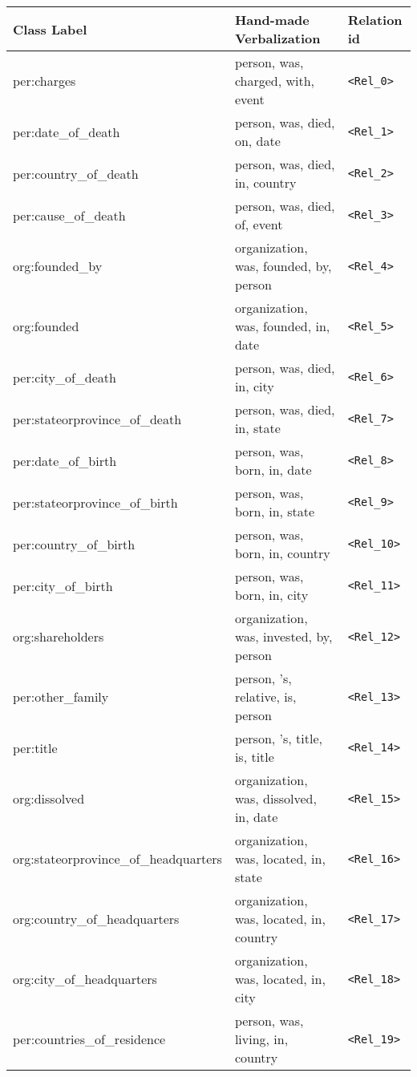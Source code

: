 \documentclass[11pt]{article}
\begin{document}
\begin{table*}[t]
	\centering
\scalebox{0.9}
	{
		\begin{tabular}{lll}  
			\toprule
			Class Label & Hand-made Verbalization&	Relation id  \\\midrule
			per:charges	& person, was, charged, with, event &\texttt{<Rel\_0>} \\
			per:date\_of\_death	&person, was, died, on, date&\texttt{<Rel\_1>} \\
			per:country\_of\_death	&person, was, died, in, country&\texttt{<Rel\_2>} \\
			per:cause\_of\_death		&person,	was, died,	of,	event&\texttt{<Rel\_3>} \\
			org:founded\_by		&organization,	was,	founded,	by,	person&\texttt{<Rel\_4>} \\
			org:founded	&	organization,	was,	founded,	in,	date&\texttt{<Rel\_5>} \\
			per:city\_of\_death&		person,	was, died,	in,	city&\texttt{<Rel\_6>} \\
			per:stateorprovince\_of\_death&		person,	was,	died,	in,	state&\texttt{<Rel\_7>} \\
			per:date\_of\_birth&		person,	was,	born,	in,	date&\texttt{<Rel\_8>} \\
			per:stateorprovince\_of\_birth&		person,	was,	born,	in,	state&\texttt{<Rel\_9>} \\
			per:country\_of\_birth&		person,	was,	born,	in,	country&\texttt{<Rel\_10>} \\
			per:city\_of\_birth	&	person,	was,	born,	in,	city&\texttt{<Rel\_11>} \\
			org:shareholders&		organization,	was,	invested,	by,	person&\texttt{<Rel\_12>} \\
			per:other\_family&		person,	's,	relative,	is,	person&\texttt{<Rel\_13>} \\
			per:title&		person,	's,	title,	is,	title&\texttt{<Rel\_14>} \\
			org:dissolved&		organization,	was,	dissolved,	in,	date&\texttt{<Rel\_15>} \\
			org:stateorprovince\_of\_headquarters&		organization,	was,	located,	in,	state&\texttt{<Rel\_16>} \\
			org:country\_of\_headquarters	&	organization,	was,	located,	in,	country&\texttt{<Rel\_17>} \\
			org:city\_of\_headquarters&		organization,	was,	located,	in,	city&\texttt{<Rel\_18>} \\
			per:countries\_of\_residence&		person,	was,	living,	in,	country&\texttt{<Rel\_19>} \\

\end{tabular}}
\end{table*}
\end{document}
